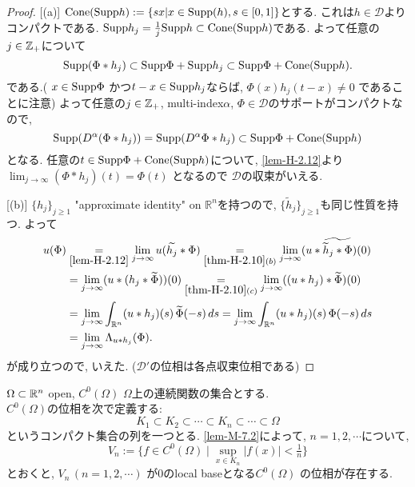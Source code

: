 \begin{proof}

[(a)]
$\mathrm{Cone}({\rm Supp} h):=\{sx | x \in \mathrm{Supp}(h), s \in [0,1] \}$とする. これは$h \in \mathcal{D}$よりコンパクトである. 
${\rm Supp} h_j  = \frac{1}{j}{\rm Supp} h \subset \mathrm{Cone}({\rm Supp} h)$である.
よって任意の\( j \in \mathbb{Z}_+\)について
 \[
 {\rm Supp}(\Phi \ast h_j) \subset {\rm Supp} \Phi + {\rm Supp} h_j \subset {\rm Supp} \Phi + \mathrm{Cone}({\rm Supp} h).
 \]
 である.( \(x \in {\rm Supp} \Phi\) かつ\(t-x \in {\rm Supp} h_j\)ならば, \(\Phi(x)h_j(t-x) \neq 0\) であることに注意)
よって任意の\( j \in \mathbb{Z}_+\), multi-index\( \alpha\), $\Phi \in \mathcal{D}$のサポートがコンパクトなので, 
\[
{\rm Supp} (D^\alpha (\Phi \ast  h_j)) 
= {\rm Supp} (D^\alpha \Phi * h_j) 
\subset {\rm Supp} \Phi + \mathrm{Cone}({\rm Supp} h)
\]
となる. 
任意の$ t \in {\rm Supp} \Phi + \mathrm{Cone}({\rm Supp} h)$について, \ref{lem-H-2.12}より
 \(\lim_{j \to \infty} (\Phi * h_j)(t) = \Phi(t)\) となるので
 $\mathcal{D}$の収束がいえる. 

[(b)]
\(\{h_j\}_{j \ge 1}\) "approximate identity" on \(\mathbb{R}^n\)を持つので, 
 \(\{\widetilde{h}_j\}_{j \ge 1}\)も同じ性質を持つ. 
 よって
\begin{align*}
u(\Phi) 
&\underset{\ref{lem-H-2.12}}{=} \lim_{j \to \infty} u(\widetilde{h_j} \ast \Phi) \underset{\ref{thm-H-2.10} (b)}{=} \lim_{j \to \infty} (u \ast \widetilde{\widetilde{h}_j  \ast \Phi})(0) \\
&= \lim_{j \to \infty} (u \ast (h_j \ast \widetilde{\Phi}))(0) 
\underset{\ref{thm-H-2.10} (c)}{=}\lim_{j \to \infty} ( (u \ast h_j) \ast \widetilde{\Phi})(0) \\
&= \lim_{j \to \infty} \int_{\mathbb{R}^n} (u \ast h_j)(s) \, \widetilde{\Phi}(-s) \, ds 
= \lim_{j \to \infty} \int_{\mathbb{R}^n} (u \ast h_j)(s) \, \Phi(-s) \, ds \\
&= \lim_{j \to \infty}  \Lambda_{u \ast h_j}(\Phi).
\end{align*}
が成り立つので, いえた. (\( \mathcal{D}'\)の位相は各点収束位相である)

\end{proof}


\begin{tcolorbox}[mybox]
\begin{defn}\cite[Definition 1.44]{Rud}
\label{defn-H-2.14}
\(\Omega \subset \mathbb{R}^n\) open,  
\(C^0(\Omega)\) \(\Omega\)上の連続関数の集合とする. \\

\(C^0(\Omega)\)の位相を次で定義する:
 \[K_1 \subset K_2 \subset \cdots \subset K_n \subset \cdots \subset \Omega\]
 というコンパクト集合の列を一つとる. 
 \ref{lem-M-7.2}によって,  \(n=1,2,\cdots\)について, 
\[
V_n := \{ f \in C^0(\Omega) \mid \sup_{x \in K_n} |f(x)| < \tfrac{1}{n} \}
\]
とおくと,  \(V_n \, (n=1,2,\cdots)\) が$0$のlocal baseとなる\(C^0(\Omega)\) の位相が存在する. 
\end{defn}
\end{tcolorbox}

